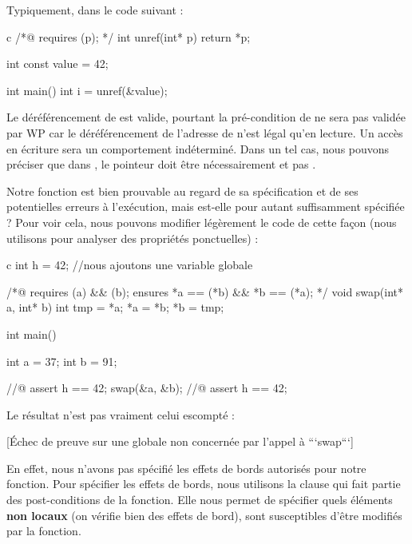\documentclass[middle]{zmdocument}
\begin{document}
Typiquement, dans le code suivant :



\begin{CodeBlock}{c}
/*@ requires \valid(p); */
int unref(int* p){
  return *p;
}

int const value = 42;

int main(){
  int i = unref(&value);
}
\end{CodeBlock}



Le déréférencement de  est valide, pourtant la pré-condition de 
ne sera pas validée par WP car le déréférencement de l'adresse de  
n'est légal qu'en lecture. Un accès en écriture sera un comportement 
indéterminé. Dans un tel cas, nous pouvons préciser que dans , le 
pointeur  doit être nécessairement  et pas .





Notre fonction  est bien prouvable au regard de sa spécification et
de ses potentielles erreurs à l'exécution, mais est-elle pour autant 
suffisamment spécifiée ? Pour voir cela, nous pouvons modifier légèrement le code
de cette façon (nous utilisons  pour analyser des propriétés 
ponctuelles) :



\begin{CodeBlock}{c}
int h = 42; //nous ajoutons une variable globale

/*@
  requires \valid(a) && \valid(b);
  ensures  *a == \old(*b) && *b == \old(*a);
*/
void swap(int* a, int* b){
  int tmp = *a;
  *a = *b;
  *b = tmp;
}

int main(){
  int a = 37;
  int b = 91;

  //@ assert h == 42;
  swap(&a, &b);
  //@ assert h == 42;
}
\end{CodeBlock}



Le résultat n'est pas vraiment celui escompté :



[Échec de preuve sur une globale non concernée par l'appel à ```swap```]


En effet, nous n'avons pas spécifié les effets de bords autorisés pour notre
fonction. Pour spécifier les effets de bords, nous utilisons la clause 
qui fait partie des post-conditions de la fonction. Elle nous permet de spécifier 
quels éléments \textbf{non locaux} (on vérifie bien des effets de bord), sont 
susceptibles d'être modifiés par la fonction.
\end{document}
